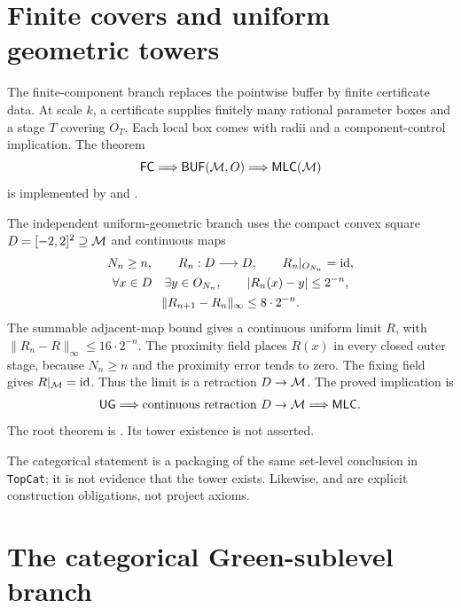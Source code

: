 \section{Finite covers and uniform geometric towers}

The finite-component branch replaces the pointwise buffer by finite
certificate data.  At scale $k$, a certificate supplies finitely many
rational parameter boxes and a stage $T$ covering $O_T$.  Each local box
comes with radii and a component-control implication.  The theorem
\[
 \mathsf{FC}\Longrightarrow\mathsf{BUF}(\mathcal M,O)
\Longrightarrow\mathsf{MLC}(\mathcal M)
\]
is implemented by
and
.

The independent uniform-geometric branch uses the compact convex
square $D=[-2,2]^2\supseteq\mathcal M$ and continuous maps
\[
 \begin{gathered}
 N_n\ge n,\qquad R_n:D\longrightarrow D,\qquad
 R_n|_{O_{N_n}}=\operatorname{id},\\
 \forall x\in D\quad\exists y\in O_{N_n},\qquad
 |R_n(x)-y|\le2^{-n},\\
 \|R_{n+1}-R_n\|_\infty\le8\cdot2^{-n}.
 \end{gathered}
\]
The summable adjacent-map bound gives a continuous uniform limit
$R$, with $\|R_n-R\|_\infty\le16\cdot2^{-n}$.
The proximity field places $R(x)$ in every closed outer stage,
because $N_n\ge n$ and the proximity error tends to zero.
The fixing field gives $R|_{\mathcal M}=\operatorname{id}$.
Thus the limit is a retraction $D\to\mathcal M$.  The proved implication is
\[
 \mathsf{UG}\Longrightarrow
 \text{continuous retraction }D\to\mathcal M
\Longrightarrow\mathsf{MLC}.
\]
The root theorem is
.
Its tower existence is not asserted.

\begin{remark}
The categorical statement
is a packaging of the same set-level conclusion in \texttt{TopCat}; it is
not evidence that the tower exists.  Likewise,
 and
 are explicit construction
obligations, not project axioms.
\end{remark}

\section{The categorical Green-sublevel branch}

